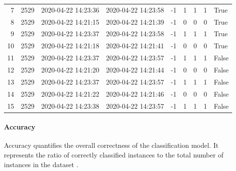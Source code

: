 \begin{table}[htbp]
{\begin{tabular}{r r l l r r r r l}
      7                               & 2529               & 2020-04-22 14:23:36  & 2020-04-22 14:23:58 & -1                & 1                      & 1                    & 1                     & True               \\
      8                               & 2529               & 2020-04-22 14:21:15  & 2020-04-22 14:21:39 & -1                & 0                      & 0                    & 0                     & True               \\
      9                               & 2529               & 2020-04-22 14:23:37  & 2020-04-22 14:23:58 & -1                & 1                      & 1                    & 1                     & True               \\
      10                              & 2529               & 2020-04-22 14:21:18  & 2020-04-22 14:21:41 & -1                & 0                      & 0                    & 0                     & True               \\
      11                              & 2529               & 2020-04-22 14:23:37  & 2020-04-22 14:23:57 & -1                & 1                      & 1                    & 1                     & False              \\
      12                              & 2529               & 2020-04-22 14:21:20  & 2020-04-22 14:21:44 & -1                & 0                      & 0                    & 0                     & False              \\
      13                              & 2529               & 2020-04-22 14:23:37  & 2020-04-22 14:23:57 & -1                & 1                      & 1                    & 1                     & False              \\
      14                              & 2529               & 2020-04-22 14:21:22  & 2020-04-22 14:21:46 & -1                & 0                      & 0                    & 0                     & False              \\
      15                              & 2529               & 2020-04-22 14:23:38  & 2020-04-22 14:23:57 & -1                & 1                      & 1                    & 1                     & False              \\
      \bottomrule
    \end{tabular}%
  }
\end{table}

\paragraph{\textbf{Accuracy}}
Accuracy quantifies the overall correctness of the classification model. It represents the ratio of correctly classified instances to the total number of instances in the dataset \autocite{fahrmeir2016statistik}.


